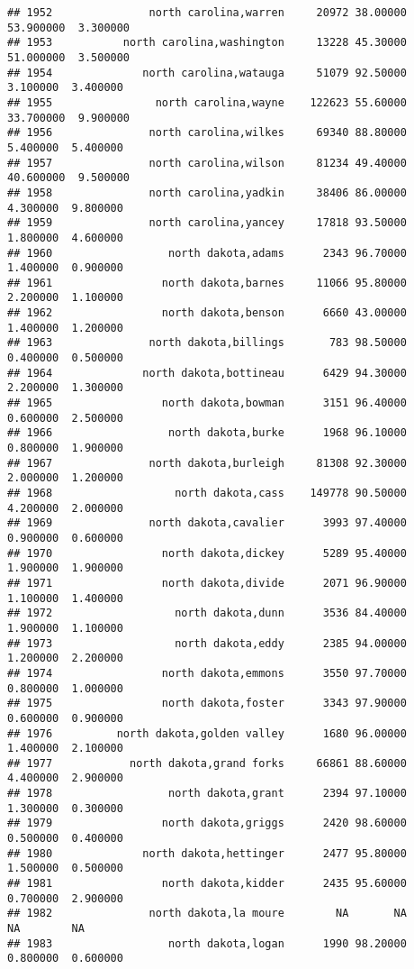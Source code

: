 \documentclass[
]{article}
\begin{document}
\begin{verbatim}
## 1952               north carolina,warren     20972 38.00000 53.900000  3.300000
## 1953           north carolina,washington     13228 45.30000 51.000000  3.500000
## 1954              north carolina,watauga     51079 92.50000  3.100000  3.400000
## 1955                north carolina,wayne    122623 55.60000 33.700000  9.900000
## 1956               north carolina,wilkes     69340 88.80000  5.400000  5.400000
## 1957               north carolina,wilson     81234 49.40000 40.600000  9.500000
## 1958               north carolina,yadkin     38406 86.00000  4.300000  9.800000
## 1959               north carolina,yancey     17818 93.50000  1.800000  4.600000
## 1960                  north dakota,adams      2343 96.70000  1.400000  0.900000
## 1961                 north dakota,barnes     11066 95.80000  2.200000  1.100000
## 1962                 north dakota,benson      6660 43.00000  1.400000  1.200000
## 1963               north dakota,billings       783 98.50000  0.400000  0.500000
## 1964              north dakota,bottineau      6429 94.30000  2.200000  1.300000
## 1965                 north dakota,bowman      3151 96.40000  0.600000  2.500000
## 1966                  north dakota,burke      1968 96.10000  0.800000  1.900000
## 1967               north dakota,burleigh     81308 92.30000  2.000000  1.200000
## 1968                   north dakota,cass    149778 90.50000  4.200000  2.000000
## 1969               north dakota,cavalier      3993 97.40000  0.900000  0.600000
## 1970                 north dakota,dickey      5289 95.40000  1.900000  1.900000
## 1971                 north dakota,divide      2071 96.90000  1.100000  1.400000
## 1972                   north dakota,dunn      3536 84.40000  1.900000  1.100000
## 1973                   north dakota,eddy      2385 94.00000  1.200000  2.200000
## 1974                 north dakota,emmons      3550 97.70000  0.800000  1.000000
## 1975                 north dakota,foster      3343 97.90000  0.600000  0.900000
## 1976          north dakota,golden valley      1680 96.00000  1.400000  2.100000
## 1977            north dakota,grand forks     66861 88.60000  4.400000  2.900000
## 1978                  north dakota,grant      2394 97.10000  1.300000  0.300000
## 1979                 north dakota,griggs      2420 98.60000  0.500000  0.400000
## 1980              north dakota,hettinger      2477 95.80000  1.500000  0.500000
## 1981                 north dakota,kidder      2435 95.60000  0.700000  2.900000
## 1982               north dakota,la moure        NA       NA        NA        NA
## 1983                  north dakota,logan      1990 98.20000  0.800000  0.600000

\end{verbatim}
\end{document}
